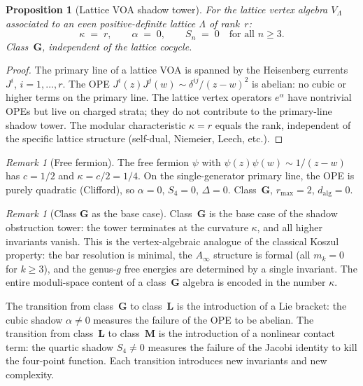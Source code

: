 \documentclass[11pt,reqno]{amsart}
\newtheorem{proposition}[theorem]{Proposition}
\theoremstyle{definition}
\theoremstyle{remark}
\newtheorem{remark}[theorem]{Remark}
\numberwithin{equation}{section}
\begin{document}
\begin{proposition}[Lattice VOA shadow
tower]\label{prop:lattice}
For the lattice vertex algebra $V_\Lambda$ associated to
an even positive-definite lattice $\Lambda$ of rank~$r$:
\[
 \kappa \;=\; r,
 \qquad
 \alpha \;=\; 0,
 \qquad
 S_n \;=\; 0 \quad\text{for all } n \ge 3.
\]
Class~$\mathbf{G}$, independent of the lattice cocycle.
\end{proposition}

\begin{proof}
The primary line of a lattice VOA is spanned by the
Heisenberg currents $J^i$, $i = 1, \ldots, r$.
The OPE $J^i(z)J^j(w) \sim \delta^{ij}/(z-w)^2$
is abelian: no cubic or higher terms on the primary line.
The lattice vertex operators $e^\alpha$ have nontrivial
OPEs but live on charged strata; they do not contribute to
the primary-line shadow tower. The modular characteristic
$\kappa = r$ equals the rank, independent of the specific
lattice structure (self-dual, Niemeier, Leech, etc.).
\end{proof}

\begin{remark}[Free fermion]\label{rem:free-fermion}
The free fermion $\psi$ with
$\psi(z)\psi(w) \sim 1/(z-w)$ has $c = 1/2$ and
$\kappa = c/2 = 1/4$. On the single-generator primary
line, the OPE is purely quadratic (Clifford), so
$\alpha = 0$, $S_4 = 0$, $\Delta = 0$.
Class~$\mathbf{G}$, $r_{\max} = 2$, $d_{\mathrm{alg}} = 0$.
\end{remark}

\begin{remark}[Class $\mathbf{G}$ as the
base case]\label{rem:class-G-base}
Class~$\mathbf{G}$ is the base case of the shadow
obstruction tower: the tower terminates at the curvature
$\kappa$, and all higher invariants vanish. This is the
vertex-algebraic analogue of the classical Koszul property:
the bar resolution is minimal, the $A_\infty$ structure
is formal (all $m_k = 0$ for $k \ge 3$), and the genus-$g$
free energies are determined by a single invariant. The
entire moduli-space content of a class~$\mathbf{G}$ algebra
is encoded in the number $\kappa$.

The transition from class~$\mathbf{G}$ to class~$\mathbf{L}$
is the introduction of a Lie bracket: the cubic shadow
$\alpha \ne 0$ measures the failure of the OPE to be
abelian. The transition from class~$\mathbf{L}$ to
class~$\mathbf{M}$ is the introduction of a nonlinear
contact term: the quartic shadow $S_4 \ne 0$ measures the
failure of the Jacobi identity to kill the four-point
function. Each transition introduces new invariants and
new complexity.
\end{remark}
\end{document}
